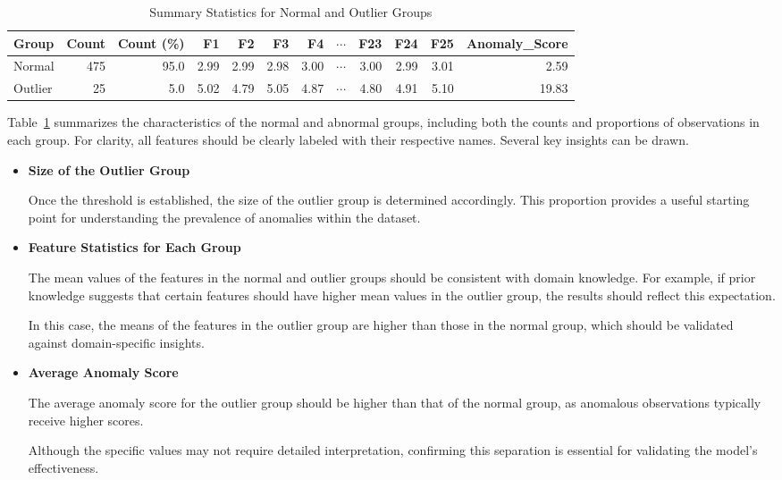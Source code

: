 \begin{table}[ht]
\centering
\caption{Summary Statistics for Normal and Outlier Groups}
\label{tab:summary_stats}
\begin{tabular}{lrrrrrrrrrrr}
\hline
Group & Count & Count (\%) & F1 & F2 & F3 &
F4 & $\cdots$  & F23 &
F24 & F25 & Anomaly\_Score \\
\hline
Normal  & 475 & 95.0 & 2.99 & 2.99 & 2.98 & 3.00 &
$\cdots$ & 3.00 & 2.99 & 3.01 & 2.59 \\
Outlier & 25  & 5.0  & 5.02 & 4.79 & 5.05 & 4.87 &
$\cdots$  & 4.80 & 4.91 & 5.10 & 19.83 \\
\hline
\end{tabular}
\end{table}



Table~\ref{tab:summary_stats} summarizes the characteristics of the normal and abnormal groups, including both the counts and proportions of observations in each group. For clarity, all features should be clearly labeled with their respective names.
Several key insights can be drawn.

\begin{itemize}
\item \textbf{Size of the Outlier Group}

Once the threshold is established, the size of the outlier group is determined accordingly. This proportion provides a useful starting point for understanding the prevalence of anomalies within the dataset.

\item \textbf{Feature Statistics for Each Group}

The mean values of the features in the normal and outlier groups should be consistent with domain knowledge. For example, if prior knowledge suggests that certain features should have higher mean values in the outlier group, the results should reflect this expectation.

In this case, the means of the features in the outlier group are higher than those in the normal group, which should be validated against domain-specific insights.

\item \textbf{Average Anomaly Score}

The average anomaly score for the outlier group should be higher than that of the normal group, as anomalous observations typically receive higher scores.

Although the specific values may not require detailed interpretation, confirming this separation is essential for validating the model's effectiveness.

\end{itemize}

